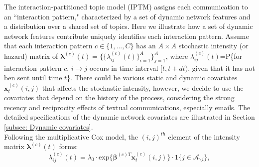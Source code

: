 \documentclass[a4paper]{article}
\begin{document}

The interaction-partitioned topic model (IPTM) assigns each communication to an ``interaction pattern," characterized by a set of dynamic network features and a distribution over a shared set of topics. Here we illustrate how a set of dynamic network features contribute uniquely identifies each interaction pattern. Assume that each interaction pattern $c \in \{1,...,C\}$ has an $A\times A$ stochastic intensity (or hazard) matrix of $\boldsymbol{\lambda}^{(c)}(t) = \{\{\lambda^{(c)}_{ij}(t)\}_{i=1}^{A}\}_{j=1}^{A}$, where $\lambda^{(c)}_{ij}(t)$=P\{for interaction pattern $c$, $i\rightarrow j$ occurs in time interval $[t, t+dt)$, given that it has not ben sent until time $t$\}. There could be various static and dynamic covariates $\boldsymbol{x}^{(c)}_t(i, j)$ that affects the stochastic intensity, however, we decide to use the covariates
that depend on the history of the process, considering the strong recency and reciprocity effects of textual communications, especially emails. The detailed specifications of the dynamic network covariates are illustrated in Section \ref{subsec: Dynamic covariates}.\\ \newline
Following the multiplicative Cox model, the $(i, j)^{th}$ element of the intensity matrix $\boldsymbol{\lambda}^{(c)}(t)$ forms:
\begin{equation}
\lambda^{(c)}_{ij}(t)=\lambda_0\cdot \mbox{exp}\Big\{\boldsymbol{\beta}^{(c)T}\boldsymbol{x}^{(c)}_t(i, j)\Big\}\cdot 1\{j \in \mathcal{A}_{\backslash i}\},
\end{equation}
\end{document}
